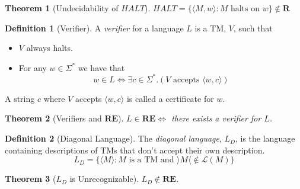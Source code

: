 \documentclass[12pt]{article}
\newtheorem{theorem}{Theorem}[section]
\theoremstyle{definition}
\newtheorem{definition}{Definition}[section]
\begin{document}
\begin{theorem}[Undecidability of $HALT$]
    $HALT = \{\langle M, w \rangle : M \text{ halts on } w\} \notin \mathbf{R}$
\end{theorem}

\begin{definition}[Verifier]
    A \emph{verifier} for a language $L$ is a TM, $V$, such that 
    \begin{itemize}
        \item $V$ always halts.
        \item For any $w \in \Sigma^*$ we have that 
        $$w \in L \iff \exists c \in \Sigma^*.(V \text{ accepts } \langle w, c \rangle)$$
    \end{itemize}
    A string $c$ where $V$ accepts $\langle w, c \rangle$ is called a certificate for $w$.
\end{definition}

\begin{theorem}[Verifiers and $\mathbf{RE}$]
    $L \in \mathbf{RE} \iff $ there exists a verifier for $L$.
\end{theorem}

\begin{definition}[Diagonal Language]
    The \emph{diagonal language}, $L_D$, is the language containing descriptions of TMs that don't accept their own description.
    $$L_D = \{\langle M \rangle : M \text{ is a TM and } \rangle M \langle \notin \mathcal{L}(M)\}$$
\end{definition}

\begin{theorem}[$L_D$ is Unrecognizable]
    $L_D \notin \mathbf{RE}$.
\end{theorem}
\end{document}
